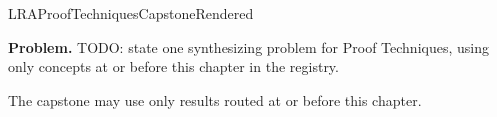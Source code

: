 \ifcsname LRAProofTechniquesCapstoneRendered\endcsname
\else
\expandafter\gdef\csname LRAProofTechniquesCapstoneRendered\endcsname{}

\newpage
{}
\label{cap:proof-techniques}

\begin{tcolorbox}[
  colback=gray!6,
  colframe=gray!40,
  arc=2pt,
  left=8pt, right=8pt, top=6pt, bottom=6pt,
  title={\small\textbf{Capstone Problem}},
  fonttitle=\small\bfseries
]
\textbf{Problem.}
TODO: state one synthesizing problem for Proof Techniques, using only concepts at or
before this chapter in the registry.
\end{tcolorbox}

\begin{remark*}
The capstone may use only results routed at or before this chapter.
\end{remark*}

\clearpage
\fi
